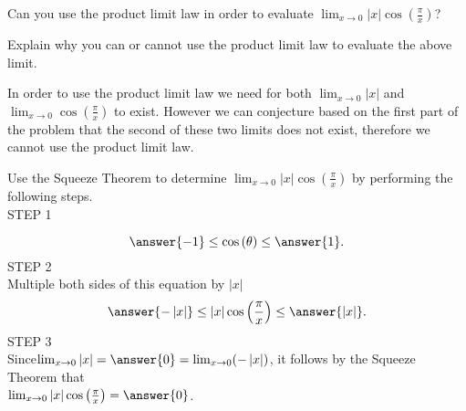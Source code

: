 \documentclass{ximera}
\begin{document}
\begin{exercise}
\begin{exercise}
\begin{exercise}

Can you use the product limit law in order to evaluate $\lim_{x\to0}\left|x\right|\cos\left(\frac{\pi}{x}\right)$?
\begin{multipleChoice}
\end{multipleChoice}

\begin{question}
Explain why you can or cannot use the product limit law to evaluate the above limit.
\begin{freeResponse}
In order to use the product limit law we need for both $\lim_{x\to0}\left|x\right|$ and $\lim_{x\to0}\cos\left(\frac{\pi}{x}\right)$ to exist.  However we can conjecture based on the first part of the problem that the second of these two limits does not exist, therefore we cannot use the product limit law.
\end{freeResponse}
\end{question}

\begin{exercise}

\begin{question}
Use the Squeeze Theorem to determine $\lim_{x\to0}\left|x\right|\cos\left(\frac{\pi}{x}\right)$ by performing the following steps.\\[1em]
STEP 1

\[
\answer{-1}\leq\cos\left(\theta\right)\leq\answer{1}.
\]  
STEP 2\\[1em]
Multiple both sides of this equation by $\left|x\right|$ 
\[
\answer{-\left|x\right|}\leq\left|x\right|\cos\left(\frac{\pi}{x}\right)\leq\answer{\left|x\right|}.
\]
STEP 3\\[1em]
Since$\lim_{x\to0}\left|x\right| = \answer{0} = \lim_{x\to0}(-\left|x\right|)$, it follows by the Squeeze Theorem that\\[1em]  $\lim_{x\to0}\left|x\right|\cos\left(\frac{\pi}{x}\right)=\answer{0}$.
\end{question}
\end{exercise}
\end{exercise}
\end{exercise}
\end{exercise}
\end{document}
